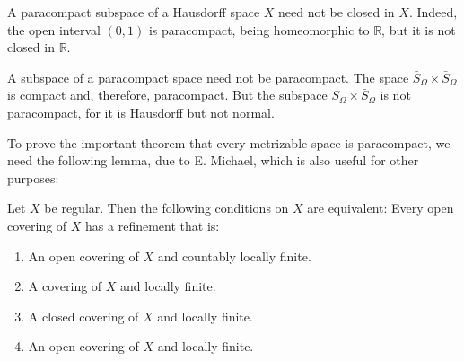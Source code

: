 \begin{centeredblock}
\begin{example}
\label{ex:\thesection.\theexample}
 A paracompact subspace of a Hausdorff space \(X\) need not be closed in \(X\). Indeed, the open interval \((0,1)\) is paracompact, being homeomorphic to \(\mathbb{R}\), but it is not closed in \(\mathbb{R}\).
\end{example}
\end{centeredblock}

\begin{centeredblock}
\begin{example}
\label{ex:\thesection.\theexample}
 A subspace of a paracompact space need not be paracompact. The space \(\bar{S}_{\Omega } \times {\bar{S}}_{\Omega }\) is compact and, therefore, paracompact. But the subspace \(S_{\Omega } \times {\bar{S}}_{\Omega }\) is not paracompact, for it is Hausdorff but not normal.
\end{example}
\end{centeredblock}

To prove the important theorem that every metrizable space is paracompact, we need the following lemma, due to E. Michael, which is also useful for other purposes:

\begin{lemma}
\label{lem:\thetheorem}
 Let \(X\) be regular. Then the following conditions on \(X\) are equivalent: Every open covering of \(X\) has a refinement that is:

\begin{enumerate}[itemsep=0.2em, parsep=0pt, topsep=0pt, partopsep=0pt, leftmargin=*, label=(\arabic*), align=left]
\item An open covering of \(X\) and countably locally finite.

\item A covering of \(X\) and locally finite.

\item A closed covering of \(X\) and locally finite.

\item An open covering of \(X\) and locally finite.
\end{enumerate}
\end{lemma}

